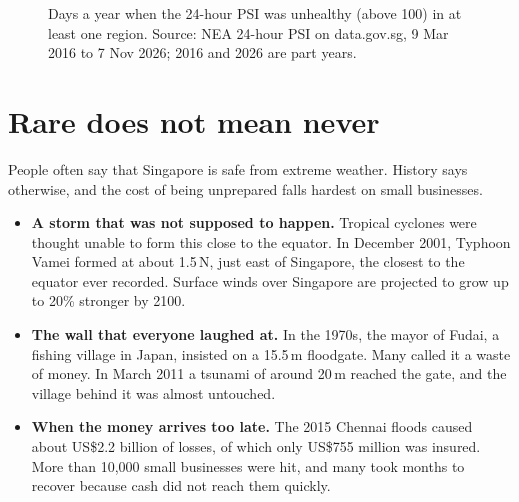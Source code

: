 \documentclass[11pt,a4paper]{article}
\begin{document}
\begin{figure}[H]
\centering
{}
\caption{Days a year when the 24-hour PSI was unhealthy (above 100) in at least one region. Source: NEA 24-hour PSI on data.gov.sg, 9 Mar 2016 to 7 Nov 2026; 2016 and 2026 are part years.\cite{team-data}}
\end{figure}

\section{Rare does not mean never}

People often say that Singapore is safe from extreme weather. History says otherwise, and the cost of being unprepared falls hardest on small businesses.

\begin{itemize}[leftmargin=1.2em]
  \item \textbf{A storm that was not supposed to happen.} Tropical cyclones were thought unable to form this close to the equator. In December 2001, Typhoon Vamei formed at about 1.5\,\textdegree N, just east of Singapore, the closest to the equator ever recorded.\cite{vamei} Surface winds over Singapore are projected to grow up to 20\% stronger by 2100.\cite{v3}
  \item \textbf{The wall that everyone laughed at.} In the 1970s, the mayor of Fudai, a fishing village in Japan, insisted on a 15.5\,m floodgate. Many called it a waste of money. In March 2011 a tsunami of around 20\,m reached the gate, and the village behind it was almost untouched.\cite{fudai}
  \item \textbf{When the money arrives too late.} The 2015 Chennai floods caused about US\$2.2 billion of losses, of which only US\$755 million was insured.\cite{chennai} More than 10,000 small businesses were hit, and many took months to recover because cash did not reach them quickly.\cite{mercy}
\end{itemize}
\end{document}

